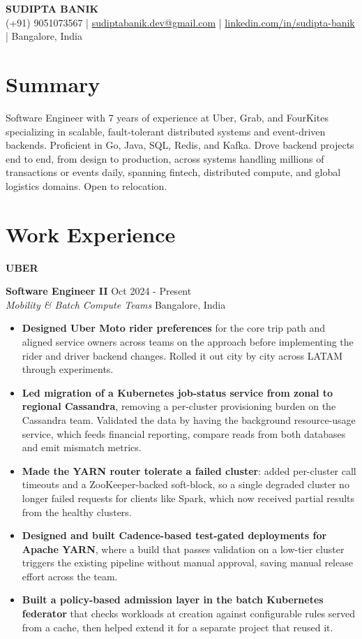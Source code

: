 \documentclass[11pt,a4paper]{article}
\newcommand{\companyheader}[1]{%
    \vspace{3pt}%
    {\Large\bfseries #1}%
    \vspace{3pt}%
}
\newcommand{\roleblock}[5]{%
    \vspace{2pt}%
    \noindent%
    \textbf{#1} \hfill #2 \\%
    \textit{#3} \hfill #4 \vspace{3pt}%
    \begin{itemize}[%
        leftmargin=*,%
        noitemsep,%
        topsep=1pt,%
        label={\small\textbullet},%
        itemsep=0pt%
    ]%
    \RaggedRight%
    \def\baselinestretch{1.0}%
        #5%
    \end{itemize}%
    \vspace{1pt}%
}
\begin{document}
\begin{center}
    {\fontsize{22pt}{24pt}\selectfont\bfseries SUDIPTA BANIK}\\[7pt]
    \small
    (+91) 9051073567 \quad|\quad
    \href{mailto:sudiptabanik.dev@gmail.com}{sudiptabanik.dev@gmail.com} \quad|\quad
    \href{https://www.linkedin.com/in/sudipta-banik}{linkedin.com/in/sudipta-banik} \quad|\quad
    Bangalore, India
\end{center}
\vspace{1pt}

\section{Summary}
\noindent Software Engineer with 7 years of experience at Uber, Grab, and FourKites specializing in scalable, fault-tolerant distributed systems and event-driven backends. Proficient in Go, Java, SQL, Redis, and Kafka. Drove backend projects end to end, from design to production, across systems handling millions of transactions or events daily, spanning fintech, distributed compute, and global logistics domains. Open to relocation.

\section{Work Experience}

\companyheader{UBER}

\roleblock
{Software Engineer II}
{Oct 2024 - Present}
{Mobility \& Batch Compute Teams}
{Bangalore, India}
{
    \item \textbf{Designed Uber Moto rider preferences} for the core trip path and aligned service owners across teams on the approach before implementing the rider and driver backend changes. Rolled it out city by city across LATAM through experiments.
    \item \textbf{Led migration of a Kubernetes job-status service from zonal to regional Cassandra}, removing a per-cluster provisioning burden on the Cassandra team. Validated the data by having the background resource-usage service, which feeds financial reporting, compare reads from both databases and emit mismatch metrics.
    \item \textbf{Made the YARN router tolerate a failed cluster}: added per-cluster call timeouts and a ZooKeeper-backed soft-block, so a single degraded cluster no longer failed requests for clients like Spark, which now received partial results from the healthy clusters.
    \item \textbf{Designed and built Cadence-based test-gated deployments for Apache YARN}, where a build that passes validation on a low-tier cluster triggers the existing pipeline without manual approval, saving manual release effort across the team.
    \item \textbf{Built a policy-based admission layer in the batch Kubernetes federator} that checks workloads at creation against configurable rules served from a cache, then helped extend it for a separate project that reused it.
}
\end{document}
